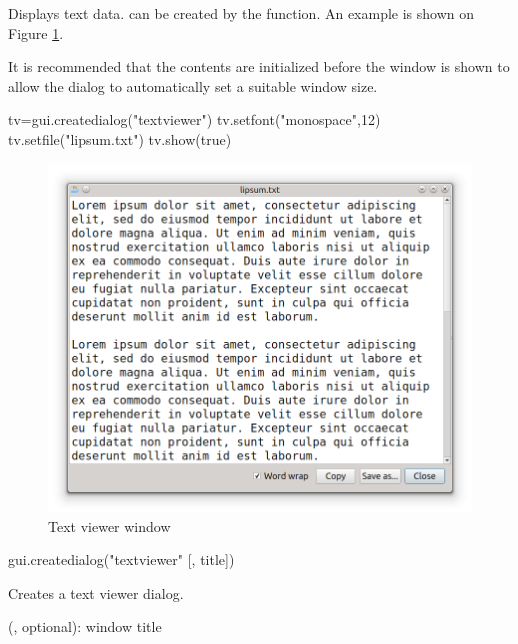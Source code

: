 \documentclass[a4paper,12pt,twoside,extrafontsizes]{memoir}
\begin{document}
Displays text data.  can be created by the  function. An example is shown on Figure \ref{fig:textviewer}.

It is recommended that the contents are initialized before the window is shown to allow the dialog to automatically set a suitable window size.

\begin{shellcmds}\begin{luacode}
tv=gui.createdialog("textviewer")
tv.setfont("monospace",12)
tv.setfile("lipsum.txt")
tv.show(true)
\end{luacode}\end{shellcmds}

\begin{figure}[htbp]
\centering
\includegraphics[scale=0.6]{images/textviewer.png}
\caption{Text viewer window}
\label{fig:textviewer}
\end{figure}


\begin{luafuncprototype}
gui.createdialog("textviewer" [, title])
\end{luafuncprototype}

\begin{funcdescr}
	Creates a text viewer dialog.
\end{funcdescr}

\begin{funcparams}
	 (, optional): window title
\end{funcparams}
\end{document}
